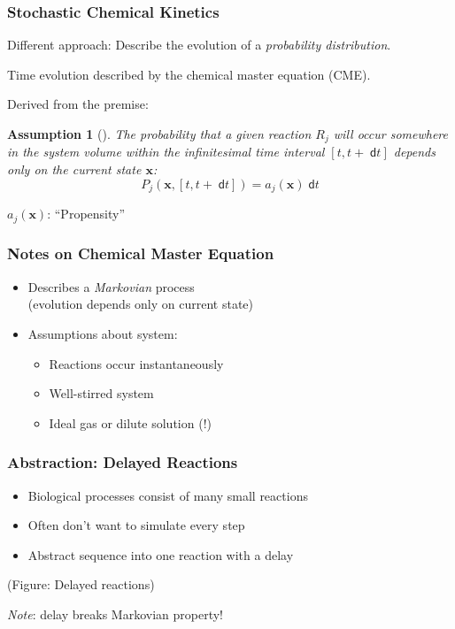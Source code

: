 \documentclass[xcolor={usenames,dvipsnames,svgnames}]{beamer}
\newcommand{\dee}{\;\mathsf{d}}
\renewcommand{\vec}[1]{\ensuremath{\mathbf{#1}}}
\newtheorem{assumption}{Assumption}
\begin{document}
\begin{frame}
    \frametitle{Stochastic Chemical Kinetics}
    Different approach: Describe the evolution of a \emph{probability distribution}.
    
    Time evolution described by the chemical master equation (CME).
    \pause

    Derived from the premise:
    \begin{assumption}[\cite{gillespie-07}]
        The probability that a given reaction $R_j$ will occur somewhere in the system volume within the infinitesimal time interval $[t, t+\dee t]$ depends only on the current state $\vec{x}$:
        \[
            P_j(\vec{x}, [t, t+\dee t]) = a_j(\vec{x})\dee t
        \]
    \end{assumption}

    $a_j(\vec{x})$: ``Propensity''
\end{frame}

\begin{frame}
    \frametitle{Notes on Chemical Master Equation}
    \begin{itemize}
        \item Describes a \emph{Markovian} process\\
            (evolution depends only on current state)

        \item Assumptions about system:
        \begin{itemize}
            \item Reactions occur instantaneously
            \item Well-stirred system
            \item Ideal gas or dilute solution (!)
        \end{itemize}
    \end{itemize}
\end{frame}

\begin{frame}
    \frametitle{Abstraction: Delayed Reactions}
    \begin{itemize}
        \item Biological processes consist of many small reactions
        \item Often don't want to simulate every step
        \item Abstract sequence into one reaction with a delay
    \end{itemize}
    (Figure: Delayed reactions)
    \pause

    \emph{Note}: delay breaks Markovian property!
\end{frame}
\end{document}

